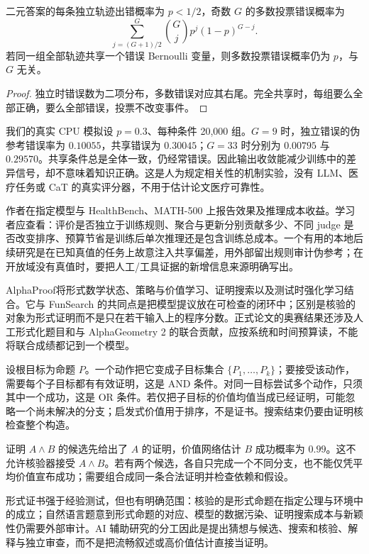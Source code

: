 \begin{proposition}
二元答案的每条独立轨迹出错概率为 $p<1/2$，奇数 $G$ 的多数投票错误概率为
\[
\sum_{j=(G+1)/2}^{G}{G\choose j}p^j(1-p)^{G-j}.
\]
若同一组全部轨迹共享一个错误 Bernoulli 变量，则多数投票错误概率仍为 $p$，与 $G$ 无关。
\end{proposition}
\begin{proof}
独立时错误数为二项分布，多数错误对应其右尾。完全共享时，每组要么全部正确，要么全部错误，投票不改变事件。
\end{proof}
我们的真实 CPU 模拟设 $p=0.3$、每种条件 20,000 组。$G=9$ 时，独立错误的伪参考错误率为 $0.10055$，共享错误为 $0.30045$；$G=33$ 时分别为 $0.00795$ 与 $0.29570$。共享条件总是全体一致，仍经常错误。因此输出收敛能减少训练中的差异信号，却不意味着知识正确。这是人为规定相关性的机制实验，没有 LLM、医疗任务或 CaT 的真实评分器，不用于估计论文医疗可靠性。

作者在指定模型与 HealthBench、MATH-500 上报告效果及推理成本收益。学习者应查看：评价是否独立于训练规则、聚合与更新分别贡献多少、不同 judge 是否改变排序、预算节省是训练后单次推理还是包含训练总成本。一个有用的本地后续研究是在已知真值的任务上故意注入共享偏差，用外部留出规则审计伪参考；在开放域没有真值时，要把人工/工具证据的新增信息来源明确写出。

\label{sec:alphaproof-bridge}
AlphaProof\cite{alphaproof}将形式数学状态、策略与价值学习、证明搜索以及测试时强化学习结合。它与 FunSearch 的共同点是把模型提议放在可检查的闭环中；区别是核验的对象为形式证明而不是只在若干输入上的程序分数。正式论文的奥赛结果还涉及人工形式化题目和与 AlphaGeometry 2 的联合贡献，应按系统和时间预算读，不能将联合成绩都记到一个模型。

设根目标为命题 $P$。一个动作把它变成子目标集合 $\{P_1,\ldots,P_k\}$；要接受该动作，需要每个子目标都有有效证明，这是 AND 条件。对同一目标尝试多个动作，只须其中一个成功，这是 OR 条件。若仅把子目标的价值均值当成已经证明，可能忽略一个尚未解决的分支；启发式价值用于排序，不是证书。搜索结束仍要由证明核检查整个构造。

\begin{example}
证明 $A\land B$ 的候选先给出了 $A$ 的证明，价值网络估计 $B$ 成功概率为 $0.99$。这不允许核验器接受 $A\land B$。若有两个候选，各自只完成一个不同分支，也不能仅凭平均价值宣布成功；需要组合成同一条合法证明并检查依赖和假设。
\end{example}
形式证书强于经验测试，但也有明确范围：核验的是形式命题在指定公理与环境中的成立；自然语言题意到形式命题的对应、模型的数据污染、证明搜索成本与新颖性仍需要外部审计。AI 辅助研究的分工因此是提出猜想与候选、搜索和核验、解释与独立审查，而不是把流畅叙述或高价值估计直接当证明。

